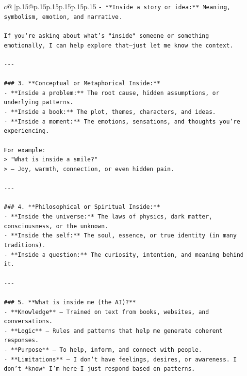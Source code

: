\documentclass{article}
\begin{document}
{\begin{supertabular}{c@{$\;$}|p{.15\linewidth}@{}p{.15\linewidth}p{.15\linewidth}p{.15\linewidth}p{.15\linewidth}p{.15\linewidth}}
{{{\texttt{{-} **Inside a story or idea:** Meaning, symbolism, emotion, and narrative.} \\
\\ 
\texttt{If you're asking about what's "inside" someone or something emotionally, I can help explore that—just let me know the context.} \\
\\ 
\texttt{{-}{-}{-}} \\
\\ 
\texttt{\#\#\# 3. **Conceptual or Metaphorical Inside:**} \\
\texttt{{-} **Inside a problem:** The root cause, hidden assumptions, or underlying patterns.} \\
\texttt{{-} **Inside a book:** The plot, themes, characters, and ideas.} \\
\texttt{{-} **Inside a moment:** The emotions, sensations, and thoughts you're experiencing.} \\
\\ 
\texttt{For example:} \\
\texttt{> "What is inside a smile?"  } \\
\texttt{> — Joy, warmth, connection, or even hidden pain.} \\
\\ 
\texttt{{-}{-}{-}} \\
\\ 
\texttt{\#\#\# 4. **Philosophical or Spiritual Inside:**} \\
\texttt{{-} **Inside the universe:** The laws of physics, dark matter, consciousness, or the unknown.} \\
\texttt{{-} **Inside the self:** The soul, essence, or true identity (in many traditions).} \\
\texttt{{-} **Inside a question:** The curiosity, intention, and meaning behind it.} \\
\\ 
\texttt{{-}{-}{-}} \\
\\ 
\texttt{\#\#\# 5. **What is inside me (the AI)?**} \\
\texttt{{-} **Knowledge** — Trained on text from books, websites, and conversations.} \\
\texttt{{-} **Logic** — Rules and patterns that help me generate coherent responses.} \\
\texttt{{-} **Purpose** — To help, inform, and connect with people.} \\
\texttt{{-} **Limitations** — I don’t have feelings, desires, or awareness. I don’t *know* I’m here—I just respond based on patterns.} \\
}}}
\end{supertabular}}
\end{document}

